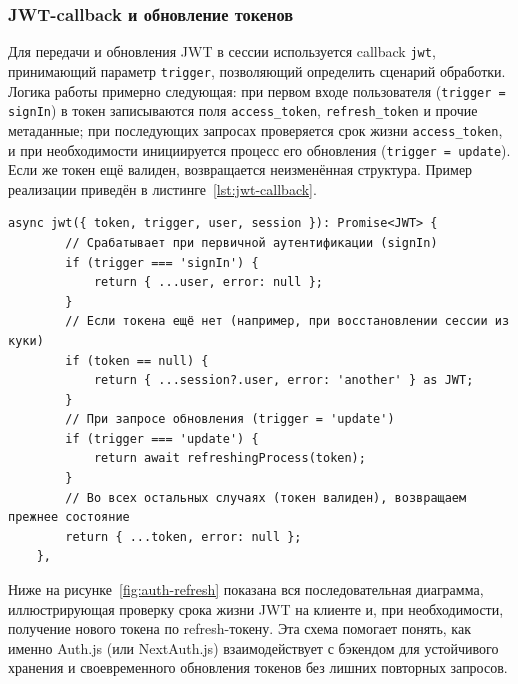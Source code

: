 \subsubsection{JWT-callback и обновление токенов}
Для передачи и обновления JWT в сессии используется callback \texttt{jwt}, принимающий параметр \texttt{trigger}, позволяющий определить сценарий обработки. Логика работы примерно следующая: при первом входе пользователя (\texttt{trigger = signIn}) в токен записываются поля \texttt{access\_token}, \texttt{refresh\_token} и прочие метаданные; при последующих запросах проверяется срок жизни \texttt{access\_token}, и при необходимости инициируется процесс его обновления (\texttt{trigger = update}). Если же токен ещё валиден, возвращается неизменённая структура. Пример реализации приведён в листинге~\ref{lst:jwt-callback}.

\begin{lstlisting}[caption={JWT-callback с учётом trigger}, label={lst:jwt-callback}]
	async jwt({ token, trigger, user, session }): Promise<JWT> {
		// Срабатывает при первичной аутентификации (signIn)
		if (trigger === 'signIn') {
			return { ...user, error: null };
		}
		// Если токена ещё нет (например, при восстановлении сессии из куки)
		if (token == null) {
			return { ...session?.user, error: 'another' } as JWT;
		}
		// При запросе обновления (trigger = 'update')
		if (trigger === 'update') {
			return await refreshingProcess(token);
		}
		// Во всех остальных случаях (токен валиден), возвращаем прежнее состояние
		return { ...token, error: null };
	},
\end{lstlisting}

Ниже на рисунке~\ref{fig:auth-refresh} показана вся последовательная диаграмма, иллюстрирующая проверку срока жизни JWT на клиенте и, при необходимости, получение нового токена по refresh-токену. Эта схема помогает понять, как именно Auth.js (или NextAuth.js) взаимодействует с бэкендом для устойчивого хранения и своевременного обновления токенов без лишних повторных запросов.

